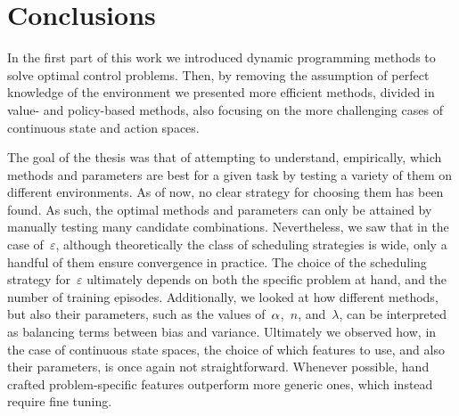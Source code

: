 \chapter{Conclusions} \label{ch:conclusions}
In the first part of this work we introduced dynamic programming methods to solve optimal control problems. Then, by removing the assumption of perfect knowledge of the environment we presented more efficient methods, divided in value- and policy-based methods, also focusing on the more challenging cases of continuous state and action spaces.

The goal of the thesis was that of attempting to understand, empirically, which methods and parameters are best for a given task by testing a variety of them on different environments. As of now, no clear strategy for choosing them has been found. As such, the optimal methods and parameters can only be attained by manually testing many candidate combinations. Nevertheless, we saw that in the case of~${\varepsilon}$, although theoretically the class of scheduling strategies is wide, only a handful of them ensure convergence in practice. The choice of the scheduling strategy for~${\varepsilon}$ ultimately depends on both the specific problem at hand, and the number of training episodes. Additionally, we looked at how different methods, but also their parameters, such as the values of~${\alpha}$,~${n}$, and~${\lambda}$, can be interpreted as balancing terms between bias and variance. Ultimately we observed how, in the case of continuous state spaces, the choice of which features to use, and also their parameters, is once again not straightforward. Whenever possible, hand crafted problem-specific features outperform more generic ones, which instead require fine tuning.


